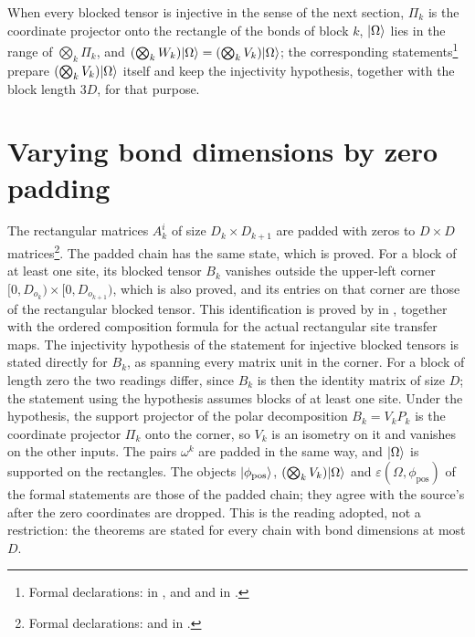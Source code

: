 \documentclass{article}
\begin{document}
When every blocked tensor is injective in the sense of the next section,
$\Pi_k$ is the coordinate projector onto the rectangle of the bonds of block $k$,
$|\Omega\rangle$ lies in the range of $\bigotimes_k\Pi_k$, and
$(\bigotimes_kW_k)|\Omega\rangle=(\bigotimes_kV_k)|\Omega\rangle$; the corresponding
statements\footnote{Formal declarations:
     in
    , and
    and 
    in .}
prepare $(\bigotimes_kV_k)|\Omega\rangle$ itself and keep the injectivity
hypothesis, together with the block length $3D$, for that purpose.

\section{Varying bond dimensions by zero padding}
The rectangular matrices $A_k^i$ of size $D_k\times D_{k+1}$ are padded with
zeros to $D\times D$ matrices\footnote{Formal declarations:
     and
    in .}.
The padded chain has the same state, which is proved. For a block of at least
one site, its blocked tensor $B_k$ vanishes outside the upper-left corner
$[0,D_{o_k})\times[0,D_{o_{k+1}})$, which is also proved, and its entries on
that corner are those of the rectangular blocked tensor. This identification
is proved by
 in
, together with the ordered
composition formula for the actual rectangular site transfer maps.
The injectivity hypothesis of the statement for injective blocked tensors
is stated directly for $B_k$, as spanning every matrix unit in the corner. For a block of length zero the
two readings differ, since $B_k$ is then the identity matrix of size $D$; the
statement using the hypothesis assumes blocks of at least one site. Under the hypothesis, the
support projector of the polar decomposition $B_k=V_kP_k$ is the coordinate
projector $\Pi_k$ onto the corner, so $V_k$ is an isometry on it and vanishes
on the other inputs. The pairs $\omega^k$ are padded in the same way,
and $|\Omega\rangle$ is supported on the rectangles. The objects
$|\phi_{\mathrm{pos}}\rangle$, $(\bigotimes_kV_k)|\Omega\rangle$ and
$\varepsilon(\Omega,\phi_{\mathrm{pos}})$ of the formal statements are those of
the padded chain; they agree with the source's after the zero coordinates are
dropped. This is the reading adopted, not a restriction: the theorems are stated
for every chain with bond dimensions at most $D$.
\end{document}
